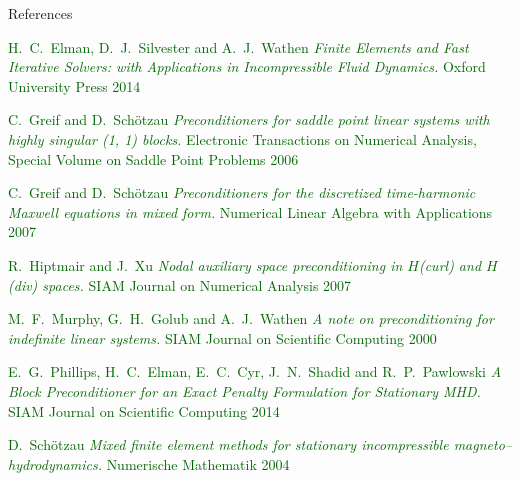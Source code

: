 \documentclass[12pt]{beamer}
\newcommand{\gr}[1]{\textcolor{darkgreen} {#1}}
\begin{document}
\begin{frame}{References}

\begin{thebibliography}{9}
\tiny
{}
\gr{H.~C.~Elman, D.~J.~Silvester and A.~J.~Wathen}
\newblock \gr{\it Finite Elements and Fast Iterative Solvers: with Applications in Incompressible Fluid Dynamics.}
\newblock \gr{Oxford University Press 2014}

\gr{C.~Greif and D.~Sch{\"o}tzau}
\newblock \gr{\it Preconditioners for saddle point linear systems with highly singular (1, 1) blocks.}
\newblock \gr{Electronic Transactions on Numerical Analysis, Special Volume on Saddle Point Problems 2006}

\gr{C.~Greif and D.~Sch{\"o}tzau}
\newblock \gr{\it Preconditioners for the discretized time-harmonic {M}axwell equations in mixed form.}
\newblock \gr{Numerical Linear Algebra with Applications 2007}

\gr{R.~Hiptmair and J.~Xu}
\newblock \gr{\it Nodal auxiliary space preconditioning in {$H$(curl) and $H$(div)} spaces.}
\newblock \gr{SIAM Journal on Numerical Analysis 2007}

\gr{M.~F.~Murphy, G.~H.~Golub and A.~J.~Wathen}
\newblock \gr{\it A note on preconditioning for indefinite linear systems.}
\newblock \gr{SIAM Journal on Scientific Computing 2000}


\gr{E.~G.~Phillips, H.~C.~Elman, E.~C.~Cyr, J.~N.~Shadid and R.~P.~Pawlowski}
\newblock \gr{\it A Block Preconditioner for an Exact Penalty Formulation for Stationary {MHD}.}
\newblock \gr{SIAM Journal on Scientific Computing 2014}


\gr{D.~Sch{\"o}tzau}
\newblock \gr{\it Mixed finite element methods for stationary incompressible magneto--hydrodynamics.}
\newblock \gr{Numerische Mathematik 2004}









\end{thebibliography}
\end{frame}
\end{document}
